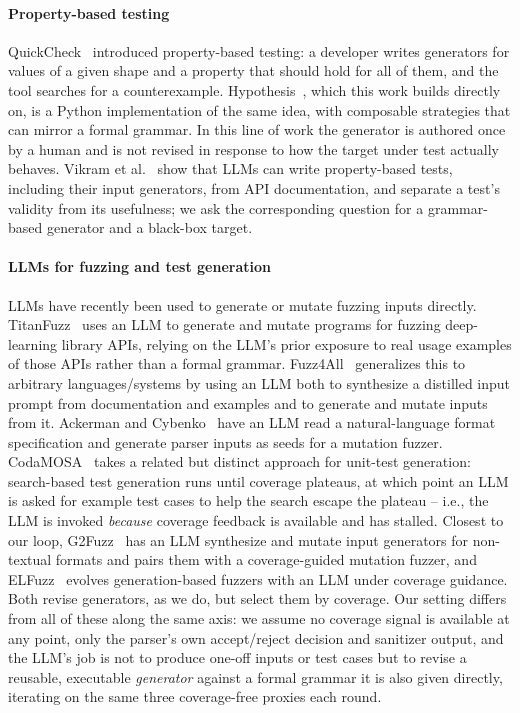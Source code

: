 \paragraph{Property-based testing}
QuickCheck~\cite{claessen2000quickcheck} introduced property-based testing:
a developer writes generators for values of a given shape and a property
that should hold for all of them, and the tool searches for a
counterexample. Hypothesis~\cite{maciver2019hypothesis}, which this work
builds directly on, is a Python implementation of the same idea, with
composable strategies that can mirror a formal grammar. In this line of work
the generator is authored once by a human and is not revised in response to
how the target under test actually behaves. Vikram et
al.~\cite{vikram2023pbt} show that LLMs can write property-based tests,
including their input generators, from API documentation, and separate a
test's validity from its usefulness; we ask the corresponding question for a
grammar-based generator and a black-box target.

\paragraph{LLMs for fuzzing and test generation}
LLMs have recently been used to generate or mutate fuzzing inputs directly.
TitanFuzz~\cite{deng2023titanfuzz} uses an LLM to generate and mutate
programs for fuzzing deep-learning library APIs, relying on the LLM's prior
exposure to real usage examples of those APIs rather than a formal grammar.
Fuzz4All~\cite{xia2024fuzz4all} generalizes this to arbitrary
languages/systems by using an LLM both to synthesize a distilled input
prompt from documentation and examples and to generate and mutate inputs
from it. Ackerman and Cybenko~\cite{ackerman2023fuzzingparsers} have an LLM
read a natural-language format specification and generate parser inputs as
seeds for a mutation fuzzer. CodaMOSA~\cite{lemieux2023codamosa} takes a related but distinct
approach for unit-test generation: search-based test generation runs until
coverage plateaus, at which point an LLM is asked for example test cases to
help the search escape the plateau -- i.e., the LLM is invoked \emph{because}
coverage feedback is available and has stalled. Closest to our loop,
G2Fuzz~\cite{zhang2025g2fuzz} has an LLM synthesize and mutate input
generators for non-textual formats and pairs them with a coverage-guided
mutation fuzzer, and ELFuzz~\cite{chen2025elfuzz} evolves generation-based
fuzzers with an LLM under coverage guidance. Both revise generators, as we
do, but select them by coverage. Our setting differs from all of these
along the same axis: we assume no coverage signal is available at any
point, only the parser's own accept/reject decision and sanitizer output,
and the LLM's job is not to produce one-off inputs or test cases but to
revise a reusable, executable \emph{generator} against a formal grammar it is
also given directly, iterating on the same three coverage-free proxies each
round.

